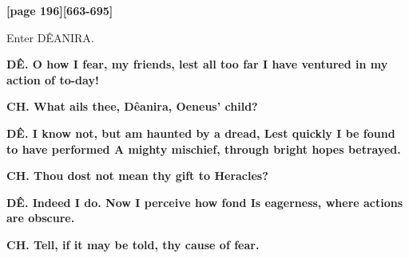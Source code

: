 \documentclass[11pt,letter]{book}
\begin{document}
\par \textbf{[page 196][663-695]}
\par 

\par  Enter DÊANIRA.

\par \textbf{DÊ. O how I fear, my friends, lest all too far I have ventured in my action of to-day!}
\par 

\par \textbf{CH. What ails thee, Dêanira, Oeneus’ child?}
\par 

\par \textbf{DÊ. I know not, but am haunted by a dread, Lest quickly I be found to have performed A mighty mischief, through bright hopes betrayed.}
\par 

\par \textbf{CH. Thou dost not mean thy gift to Heracles?}
\par 

\par \textbf{DÊ. Indeed I do. Now I perceive how fond Is eagerness, where actions are obscure.}
\par 

\par \textbf{CH. Tell, if it may be told, thy cause of fear.}
\par 
\end{document}
